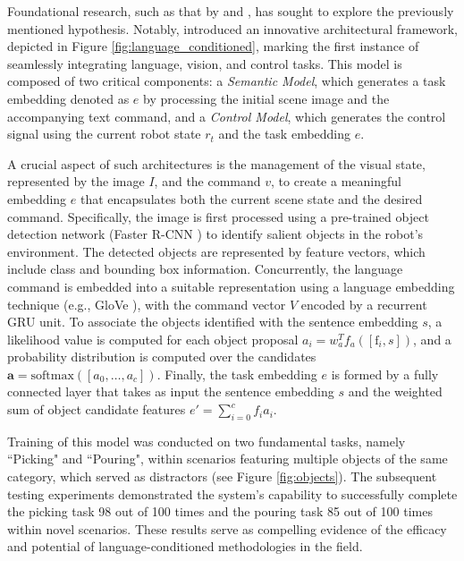 Foundational research, such as that by \cite{stepputtis2020language} and \cite{jang2022bc_z}, has sought to explore the previously mentioned hypothesis. Notably, \cite{stepputtis2020language} introduced an innovative architectural framework, depicted in Figure \ref{fig:language_conditioned}, marking the first instance of seamlessly integrating language, vision, and control tasks. This model is composed of two critical components: a \textit{Semantic Model}, which generates a task embedding denoted as $e$ by processing the initial scene image and the accompanying text command, and a \textit{Control Model}, which generates the control signal using the current robot state $r_{t}$ and the task embedding $e$.

A crucial aspect of such architectures is the management of the visual state, represented by the image $I$, and the command $v$, to create a meaningful embedding $e$ that encapsulates both the current scene state and the desired command. Specifically, the image is first processed using a pre-trained object detection network (Faster R-CNN \cite{fastrcnn}) to identify salient objects in the robot's environment. The detected objects are represented by feature vectors, which include class and bounding box information. Concurrently, the language command is embedded into a suitable representation using a language embedding technique (e.g., GloVe \cite{pennington2014glove}), with the command vector $V$ encoded by a recurrent GRU unit. To associate the objects identified with the sentence embedding $s$, a likelihood value is computed for each object proposal $a_{i} = w_{a}^{T} f_{a}([\text{f}_{i}, s])$, and a probability distribution is computed over the candidates $\mathbf{a} = \text{softmax}([a_0, \dots, a_c])$. Finally, the task embedding $e$ is formed by a fully connected layer that takes as input the sentence embedding $s$ and the weighted sum of object candidate features $e'= \sum_{i=0}^{c} f_{i}a_{i}$.

Training of this model was conducted on two fundamental tasks, namely ``Picking" and ``Pouring", within scenarios featuring multiple objects of the same category, which served as distractors (see Figure \ref{fig:objects}). The subsequent testing experiments demonstrated the system's capability to successfully complete the picking task 98 out of 100 times and the pouring task 85 out of 100 times within novel scenarios. These results serve as compelling evidence of the efficacy and potential of language-conditioned methodologies in the field.


